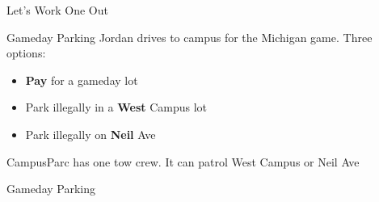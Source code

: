 
\begin{frame}[standout]
Let's Work One Out
\end{frame}

\begin{frame}{Gameday Parking}
Jordan drives to campus for the Michigan game. Three options:
\begin{itemize}
    \item \textbf{Pay} for a gameday lot
    \item Park illegally in a \textbf{West} Campus lot
    \item Park illegally on \textbf{Neil} Ave
\end{itemize}
CampusParc has one tow crew. It can patrol West Campus or Neil Ave
\bsk
\centering
\begin{matrixgame}[top={Patrol West, Patrol Neil}, left={Pay, West, Neil}, player names={Jordan, CampusParc}, w=2.1]
\end{matrixgame}
\end{frame}


\begin{frame}{Gameday Parking}
\centering
\begin{matrixgame}[top={Patrol West, Patrol Neil}, left={Pay, West, Neil}, player names={Jordan, CampusParc}, w=2.1]
\end{matrixgame}
\vfill
\end{frame}


